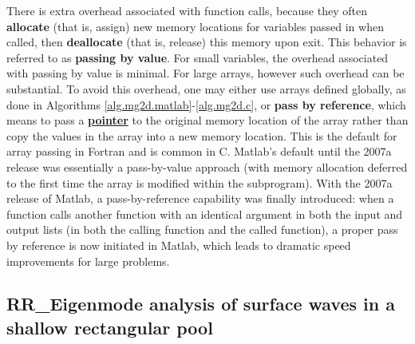 \enlargethispage{10pt}

There is extra overhead associated with function calls, because they often
{\bf allocate} (that is, assign) new memory locations for variables passed in when called, then {\bf deallocate} (that is, release) this memory
upon exit.  This behavior is referred to as {\bf passing by value}.  For small variables, the overhead associated with passing by value is minimal.
For large arrays, however such overhead can be substantial.  To avoid this overhead, one may either use arrays defined globally,
as done in Algorithms \ref{alg.mg2d.matlab}-\ref{alg.mg2d.c}, or {\bf pass by reference}, which means to pass a \href{http://www.cs.stanford.edu/cslibrary/PointerFunCBig.avi}{\bf pointer}
to the original memory location of the array rather than copy the values in the array into a new memory location.
This is the default for array passing in Fortran and is common in C.  Matlab's default until the 2007a release was essentially a pass-by-value approach (with memory allocation deferred
to the first time the array is modified within the subprogram).  With the 2007a release of Matlab, a pass-by-reference capability was finally introduced:
when a function calls another function with an identical argument in both the input and output lists (in both the calling function and the called function),
a proper pass by reference is now initiated in Matlab, which leads to dramatic speed improvements for large problems.

\subsection{RR_Eigenmode analysis of surface waves in a shallow rectangular pool}\label{sec.A.C.B.2d}
\enlargethispage{10pt}

